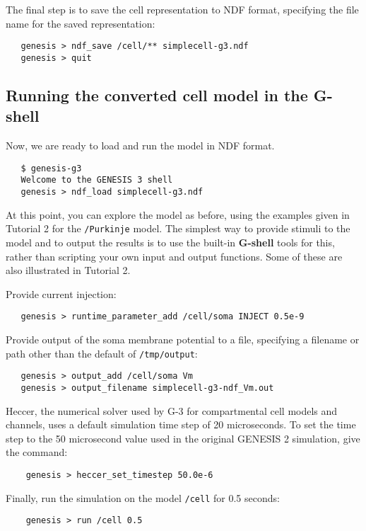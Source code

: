 \documentclass[12pt]{article}
\begin{document}

The final step is to save the cell representation to NDF format,
specifying the file name for the saved representation:
\begin{verbatim}
   genesis > ndf_save /cell/** simplecell-g3.ndf
   genesis > quit
\end{verbatim}

\subsection*{Running the converted cell model in the G-shell}

Now, we are ready to load and run the model in NDF format.
\begin{verbatim}
   $ genesis-g3
   Welcome to the GENESIS 3 shell
   genesis > ndf_load simplecell-g3.ndf
\end{verbatim}
At this point, you can explore the model as before, using the examples
given in Tutorial 2 for the {\tt /Purkinje} model.  The simplest
way to provide stimuli to the model and to output the results
is to use the built-in {\bf G-shell} tools for this, rather than scripting
your own input and output functions.  Some of these are also illustrated
in Tutorial 2.

Provide current injection:
\begin{verbatim}
   genesis > runtime_parameter_add /cell/soma INJECT 0.5e-9
\end{verbatim}

Provide output of the soma membrane potential to a file, specifying
a filename or path other than the default of {\tt /tmp/output}:
\begin{verbatim}
   genesis > output_add /cell/soma Vm
   genesis > output_filename simplecell-g3-ndf_Vm.out
\end{verbatim}

Heccer, the numerical solver used by G-3 for compartmental cell models and channels,
uses a default simulation time step of 20 microseconds.  To set the time step to the
50 microsecond value used in the original GENESIS 2 simulation, give the command:

\begin{verbatim}
    genesis > heccer_set_timestep 50.0e-6
\end{verbatim}

Finally, run the simulation on the model {\tt /cell} for 0.5 seconds:
\begin{verbatim}
    genesis > run /cell 0.5
\end{verbatim}
\end{document}
